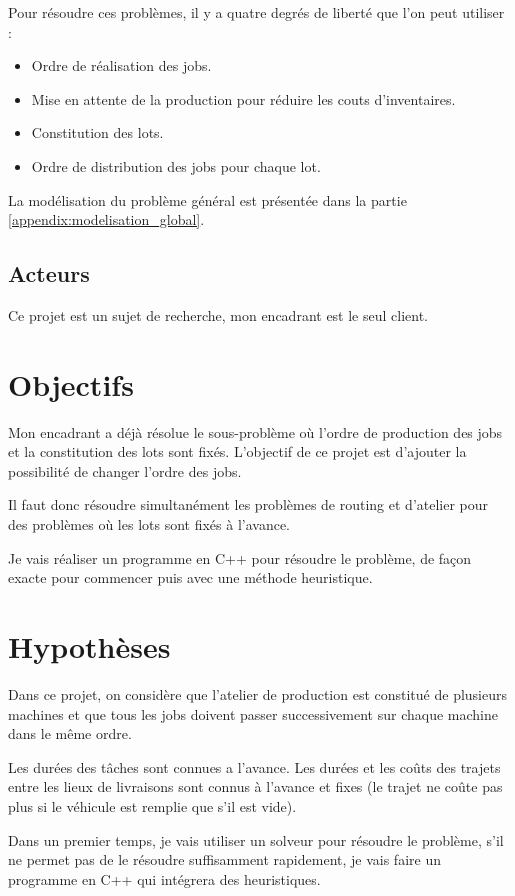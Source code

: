 Pour résoudre ces problèmes, il y a quatre degrés de liberté que l'on peut utiliser :
\begin{itemize}
    \item Ordre de réalisation des jobs.
    \item Mise en attente de la production pour réduire les couts d'inventaires.
    \item Constitution des lots.
    \item Ordre de distribution des jobs pour chaque lot.
\end{itemize}

La modélisation du problème général est présentée dans la partie \autoref{appendix:modelisation_global}.

\subsection{Acteurs}
Ce projet est un sujet de recherche, mon encadrant est le seul client.

\section{Objectifs}
Mon encadrant a déjà résolue le sous-problème où l'ordre de production des jobs et la constitution des lots sont fixés.
L'objectif de ce projet est d'ajouter la possibilité de changer l'ordre des jobs.

Il faut donc résoudre simultanément les problèmes de routing et d'atelier pour des problèmes où les lots sont fixés à l'avance.

Je vais réaliser un programme en C++ pour résoudre le problème,
de façon exacte pour commencer puis avec une méthode heuristique.

\section{Hypothèses}
Dans ce projet, on considère que l'atelier de production est constitué de plusieurs machines 
    et que tous les jobs doivent passer successivement sur chaque machine dans le même ordre.

Les durées des tâches sont connues a l'avance.
Les durées et les coûts des trajets entre les lieux de livraisons sont connus à l'avance 
    et fixes (le trajet ne coûte pas plus si le véhicule est remplie que s'il est vide).

Dans un premier temps, je vais utiliser un solveur pour résoudre le problème, 
    s'il ne permet pas de le résoudre suffisamment rapidement, 
    je vais faire un programme en C++ qui intégrera des heuristiques.

